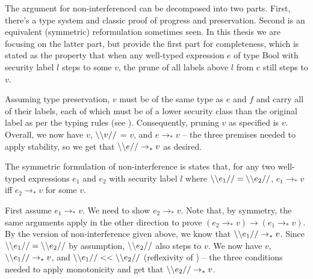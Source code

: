 \documentclass[12pt]{report}
\begin{document}
The argument for non-interferenced can be decomposed into two parts.
First, there's a type system and classic proof of progress and
preservation. Second is an equivalent (symmetric) reformulation
sometimes seen. In this thesis we are focusing on the latter part,
but provide the first part for completeness, which is stated as the
property that when any well-typed expression $e$ of type Bool with
security label $l$ steps to some  $v$, the prune of
all labels above $l$ from $e$ still steps to $v$.

Assuming type preservation, $v$ must be of the same type as $e$ and
$f$ and carry all of their labels, each of which must be of a lower
security class than the original label as per the typing rules (see
). Consequently, pruning $v$ as specified is
$v$. Overall, we now have  $v$, $\backslash\backslash {v} //$ = $v$,
and $e\to_* v$ – the three premises needed to apply stability, so we
get that $\backslash\backslash {e} //\to_* v$ as desired.

The symmetric formulation of non-interference is states that, for any
two well-typed expressions $e_1$ and $e_2$ with security label $l$
where $\backslash\backslash {e_1} // = \backslash\backslash {e_2} //$, $e_1 \to_* v$ iff $e_2 \to_* v$
for some  $v$. 

First assume $e_1\to_* v$. We need to show $e_2\to_* v$. Note that,
by symmetry, the same arguments apply in the other direction to prove
$(e_2\to_* v) \to (e_1\to_* v)$. By the version of non-interference
given above, we know that $\backslash\backslash {e_1} //\to_* v$. Since $\backslash\backslash {e_1} //
= \backslash\backslash {e_2} //$ by assumption, $\backslash\backslash {e_2} //$ also steps to $v$. We now
have  $v$, $\backslash\backslash {e_1} //\to_* v$, and $\backslash\backslash {e_1} //
<< \backslash\backslash {e_2} //$ (reflexivity of ) – the three
conditions needed to apply monotonicity and get that
$\backslash\backslash {e_2} //\to_* v$.

{}


\end{document}
